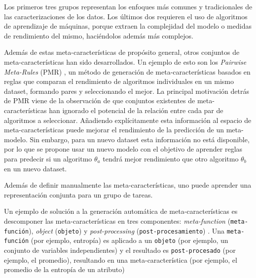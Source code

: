 Los primeros tres grupos representan los enfoques más comunes y tradicionales de las caracterizaciones de los datos. Los últimos dos requieren el uso de algoritmos de aprendizaje de máquinas, porque extraen la complejidad del modelo o medidas de rendimiento del mismo, haciéndolos además más complejos.

Además de estas meta-características de propósito general, otros conjuntos de meta-características han sido desarrollados. Un ejemplo de esto son los \textit{Pairwise Meta-Rules} (PMR) \cite{sun2013pairwise}, un método de generación de meta-características basados en reglas que comparan el rendimiento de algoritmos individuales en un mismo dataset, formando pares y seleccionando el mejor. La principal motivación detrás de PMR viene de la observación de que conjuntos existentes de meta-características han ignorado el potencial de la relación entre cada par de algoritmos a seleccionar. Añadiendo explícitamente esta información al espacio de meta-características puede mejorar el rendimiento de la predicción de un meta-modelo. Sin embargo, para un nuevo dataset esta información no está disponible, por lo que se propone usar un nuevo modelo con el objetivo de aprender reglas para predecir si un algoritmo $\theta_a$ tendrá mejor rendimiento que otro algoritmo $\theta_b$ en un nuevo dataset.

Además de definir manualmente las meta-características, uno puede aprender una representación conjunta para un grupo de tareas. 

Un ejemplo de solución a la generación automática de meta-características es descomponer las meta-características en tres componentes: \textit{meta-function} (\texttt{meta-función}), \textit{object} (\texttt{objeto}) y \textit{post-processing} (\texttt{post-procesamiento}) \cite{Pinto2016TowardsAG, pinto2014framework}. Una \texttt{meta-función} (por ejemplo, entropía) es aplicado a un \texttt{objeto} (por ejemplo, un conjunto de variables independientes) y el resultado es \texttt{post-procesado} (por ejemplo, el promedio), resultando en una meta-característica (por ejemplo, el promedio de la entropía de un atributo) %

